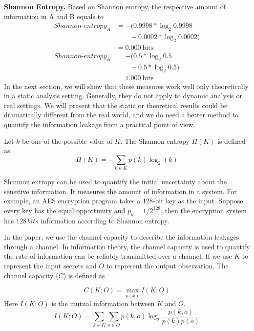 \textbf{Shannon Entropy.}
Based on Shannon entropy, the respective amount of information in A and B equals to
{\footnotesize
\begin{align*}
    \mathit{Shannon\text{-}entropy_A} & = -(0.9998*\log_{2}0.9998      \\
                                    & \qquad+ 0.0002*\log_{2}0.0002)  \\
                                    & = 0.000\ \mathrm{bits}         \\
    \mathit{Shannon\text{-}entropy_B} & = -(0.5*\log_{2}0.5      \\
                                    & \qquad+ 0.5*\log_{2}0.5)        \\
                                    & = 1.000\ \mathrm{bits}                             
\end{align*}
}
In the next section, we will show that these measures work well only
theoretically in a static analysis setting. 
Generally, they do not apply to dynamic analysis or real
settings. We will present that the static or theoretical results could be
dramatically different from the real world, and we do need a better method to
quantify the information leakage from a practical point of view.


Let $k$ be one of the possible
value of $K$. The Shannon entropy $H(K)$ is defined as
\begin{equation}\label{eq1}
    H(K) = - \sum_{k {\in} K}p(k)\log_2(k)
\end{equation}

Shannon entropy can be used to quantify the initial uncertainty about the sensitive information. It measures the amount of information in a system. For example, an AES encryption program takes a 128-bit key as the input. Suppose every key has the equal opportunity and $p_k = 1/ 2^{128}$, then the encryption system has $128 \, \mathit{bits}$ information according to Shannon entropy. 


In the paper, we use the channel capacity to describe the information leakages through a channel. In information theory, the channel capacity is used to quantify the rate of information can be reliably transmitted over a channel. If we use $K$ to represent the input secrets and $O$ to represent the output observation. The channel capacity ($C$) is defined as 

\begin{equation}\label{eq2}
C(K;O) = \max_{p(x)} I(K;O)
\end{equation}
Here $I(K;O)$ is the mutual information between $K$ and $O$.  
\begin{equation} \label{eq3}
    I(K;O) = \sum_{k {\in} K}{\sum_{o {\in} O}{p(k, o)\log_2\frac{p(k, o)}{p(k)p(o)}}}
\end{equation}

